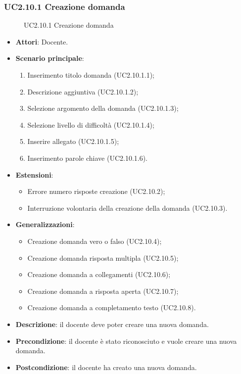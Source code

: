 \subsubsection{UC2.10.1 Creazione domanda}
\begin{figure}[H]
\centering
\noindent{}
\caption{UC2.10.1 Creazione domanda}
\end{figure}
\begin{itemize}
\item \textbf{Attori}: Docente.
\item \textbf{Scenario principale}:
\begin{enumerate}
\item Inserimento titolo domanda (UC2.10.1.1);
\item Descrizione aggiuntiva (UC2.10.1.2);
\item Selezione argomento della domanda (UC2.10.1.3);
\item Selezione livello di difficoltà (UC2.10.1.4);
\item Inserire allegato (UC2.10.1.5);
\item Inserimento parole chiave (UC2.10.1.6).
\end{enumerate}
\item \textbf{Estensioni}:
\begin{itemize}
\item Errore numero risposte creazione (UC2.10.2);
\item Interruzione volontaria della creazione della domanda (UC2.10.3).
\end{itemize}
\item \textbf{Generalizzazioni}:
\begin{itemize}
\item Creazione domanda vero o falso (UC2.10.4);
\item Creazione domanda risposta multipla (UC2.10.5);
\item Creazione domanda a collegamenti (UC2.10.6);
\item Creazione domanda a risposta aperta (UC2.10.7);
\item Creazione domanda a completamento testo (UC2.10.8).
\end{itemize}
\item \textbf{Descrizione}: il docente deve poter creare una nuova domanda.
\item \textbf{Precondizione}: il docente è stato riconosciuto e vuole creare una nuova domanda.
\item \textbf{Postcondizione}: il docente ha creato una nuova domanda.
\end{itemize}
